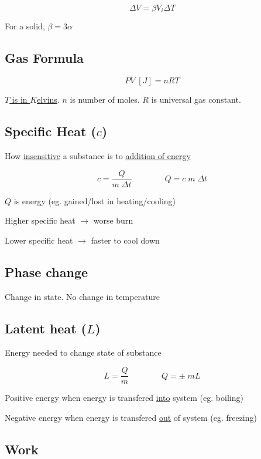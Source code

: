 \documentclass[12pt, twocolumn]{article}
\begin{document}
\begin{spacing}{1.5}
$$\Delta V = \beta V_i \Delta T$$

For a solid, $\beta = 3\alpha$

\subsection{Gas Formula}

$$PV \; [J] = nRT$$

\underline{$T$ is in $K$elvins}. $n$ is number of moles. $R$ is universal gas constant.

\subsection{Specific Heat ($c$)}

How \underline{insensitive} a substance is to \underline{addition of energy}

$$c = \frac{Q}{m \; \Delta t} \qquad \qquad 
Q = c \; m \; \Delta t$$

$Q$ is energy (eg. gained/lost in heating/cooling)

\begin{itemize*}
	\item Higher specific heat $\rightarrow$ worse burn
	\item Lower specific heat $\rightarrow$ faster to cool down
\end{itemize*}

\subsection{Phase change}

Change in state. No change in temperature

\subsection{Latent heat ($L$)}

Energy needed to change state of substance

$$L = \frac{Q}{m} \qquad \qquad Q = \pm \; m L$$

\begin{itemize*}
	\item Positive energy when energy is transfered \underline{into} system (eg. boiling)
	\item Negative energy when energy is transfered \underline{out} of system (eg. freezing)
\end{itemize*}

\subsection{Work}


\end{spacing}
\end{document}
